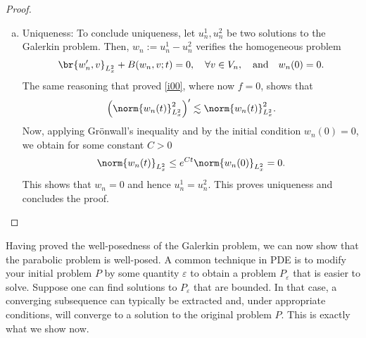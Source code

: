 \documentclass[
    a4paper,
    DIV=14,
    abstract=true,
    numbers=noenddot
]{scrartcl}
\begin{document}
\begin{proof}
\begin{enumerate}[a)]
\begin{align*}
       \end{align*}
 where we used that $\norm{v_n}_{H^1_x}= \norm{v}_{H^1_x}- \norm{v_n^\perp}_{H^1_x} \leq \norm{v}_{H^1_x}$. We deduce that
       \begin{align}\label{i2}
         \norm{u_n'(t)}_{H^{-1}_x} \lesssim \norm{f(t)}_{H_x^{-1}} + \norm{ u_n(t)}_{H^1_x}.
       \end{align}
 Integrating the square over $I$ and using \eqref{hb} in \eqref{i2} gives
       \begin{align}\label{i3}
         \norm{u_n'(t)}^2_{L_t^2H^{-1}_x} \lesssim \norm{f(t)}^2_{L^2_t H_x^{-1}} + \norm{g}^2_{L_x^2}.
       \end{align}
 Now, combining \eqref{ub} and \eqref{hb}, \eqref{i3} and taking square roots, we obtain the desired bound \eqref{bound}.

    \item Uniqueness:  To conclude uniqueness, let $u_n^{{1}}, u_n^{{2}}$ be two solutions to the Galerkin problem. Then, $w_n := u_n^{{1}}-u_n^{{2}}$ verifies the homogeneous problem
       \begin{align*}
         \br{w_n',v}_{L^2_x} + B(w_n,v;t) = 0, \quad \forall v \in V_n, \quad \text{and} \quad w_n(0) = 0.
       \end{align*}
 The same reasoning that proved \eqref{i00}, where now $f=0$, shows that
       \begin{align*}
         \left(\norm{w_n(t)}_{L_x^2}^2\right)' \lesssim \norm{w_n(t)}^2_{L_x^2}.
       \end{align*}
 Now, applying Grönwall's inequality and by the initial condition $w_n(0)=0$, we obtain for some constant $C>0$
       \begin{align}\label{w0}
         \norm{w_n(t)}_{L_x^2} \leq e^{Ct} \norm{w_n(0)}_{L_x^2} = 0.
       \end{align}
 This shows that $w_n=0$ and hence $u_n^{{1}}=u_n^{{2}}$. This proves uniqueness and concludes the proof.
  \end{enumerate}
\end{proof}
Having proved the well-posedness of the Galerkin problem, we can now show that the parabolic problem is well-posed.
A common technique in PDE is to modify your initial problem $P$ by some quantity $\varepsilon $ to obtain a problem $P_ \varepsilon $ that is easier to solve. Suppose one can find solutions to $P_ \varepsilon $ that are bounded. In that case, a converging subsequence can typically be extracted and, under appropriate conditions, will converge to a solution to the original problem $P$. This is exactly what we show now.
\end{document}
